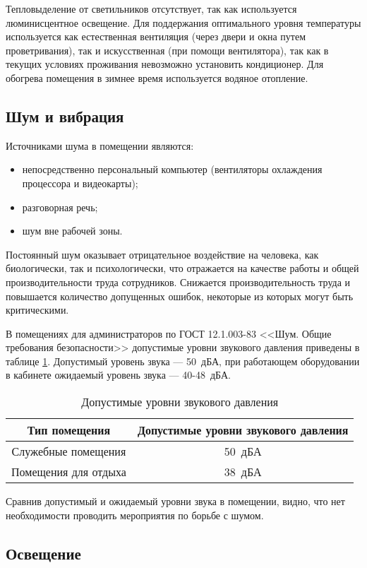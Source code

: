 Тепловыделение от светильников отсутствует, так как используется люминисцентное освещение.
Для поддержания оптимального уровня температуры используется как естественная вентиляция (через двери и окна путем проветривания), так и искусственная (при помощи вентилятора), так как в текущих условиях проживания невозможно установить кондиционер.
Для обогрева помещения в зимнее время используется водяное отопление.

\subsection{Шум и вибрация}

Источниками шума в помещении являются:
\begin{itemize}
  \item непосредственно персональный компьютер (вентиляторы охлаждения процессора и видеокарты);
  \item разговорная речь;
  \item шум вне рабочей зоны.
\end{itemize}

Постоянный шум оказывает отрицательное воздействие на человека, как биологически, так и психологически, что отражается на качестве работы и общей производительности труда сотрудников.
Снижается производительность труда и повышается количество допущенных ошибок, некоторые из которых могут быть критическими.

В помещениях для администраторов по ГОСТ 12.1.003-83 <<Шум. Общие требования безопасности>> допустимые уровни звукового давления приведены в таблице \ref{sound-tab}.
Допустимый уровень звука --- 50~дБА, при работающем оборудовании в кабинете ожидаемый уровень звука --- 40-48~дБА.
\begin{table}[H]
  \caption{Допустимые уровни звукового давления}\label{sound-tab}
  \begin{tabular}{|c|c|}
  \hline Тип помещения & Допустимые уровни звукового давления \\
  \hline Служебные помещения & 50~дБА \\
  \hline Помещения для отдыха & 38~дБА \\
  \hline 
  \end{tabular}
\end{table}

Сравнив допустимый и ожидаемый уровни звука в помещении, видно, что нет необходимости проводить мероприятия по борьбе с шумом.

\subsection{Освещение}

